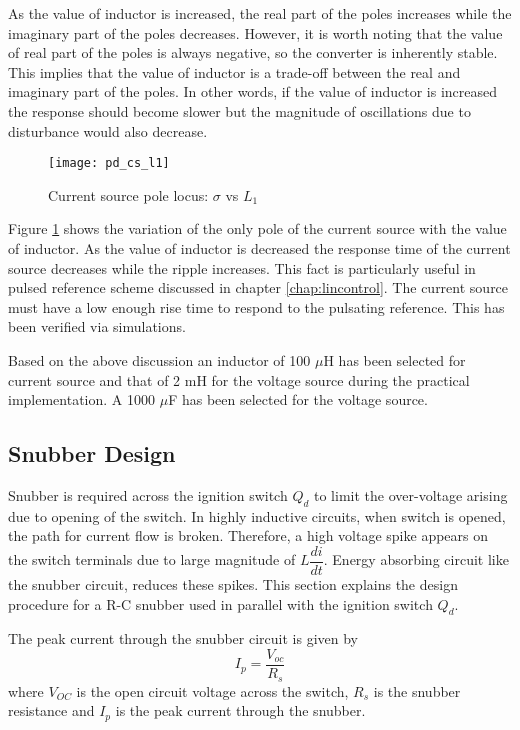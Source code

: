 	As the value of inductor is increased, the real part of the poles increases while the imaginary part of the poles decreases.  However, it is worth noting that the value of real part of the poles is always negative, so the converter is inherently stable. This implies that the value of inductor is a trade-off between the real and imaginary part of the poles. In other words, if the value of inductor is increased the response should become slower but the magnitude of oscillations due to disturbance would also decrease.
	\begin{figure}[h]
		\centering
		\texttt{[image: pd\_cs\_l1]}
		\caption{Current source pole locus: $\sigma$ vs $L_1$}
		\label{fig:pd_cs_l1}
	\end{figure}
	Figure \ref{fig:pd_cs_l1} shows the variation of the only pole of the current source with the value of inductor. As the value of inductor is decreased the response time of the current source decreases while the ripple increases. This fact is particularly useful in pulsed reference scheme discussed in chapter \ref{chap:lincontrol}. The current source must have a low enough rise time to respond to the pulsating reference. This has been verified via simulations.
	
	Based on the above discussion an inductor of 100 $\mu$H has been selected for current source and that of 2 mH for the voltage source during the practical implementation. A 1000 $\mu$F has been selected for the voltage source.	

\subsection{Snubber Design}
	Snubber is required across the ignition switch $Q_d$ to limit the over-voltage arising due to opening of the switch. In highly inductive circuits, when switch is opened, the path for current flow is broken. Therefore, a high voltage spike appears on the switch terminals due to large magnitude of $L\dfrac{di}{dt}$. Energy absorbing circuit like the snubber circuit, reduces these spikes. This section explains the design procedure for a R-C snubber used in parallel with the ignition switch $Q_d$.

	The peak current through the snubber circuit is given by
	\begin{equation}
		I_p = \dfrac{V_{oc}}{R_s}
		\label{eq:snub-1}
	\end{equation}
	where $V_{OC}$ is the open circuit voltage across the switch, $R_s$ is the snubber resistance and $I_p$ is the peak current through the snubber.


